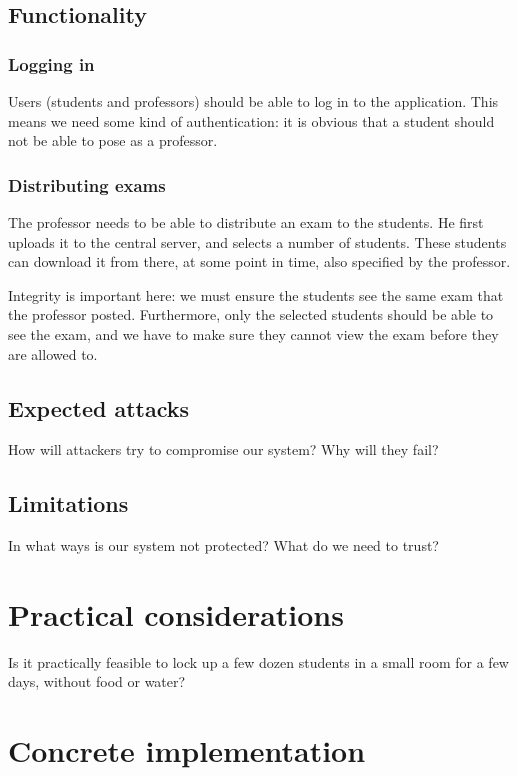 \documentclass{article}
\begin{document}
\subsection{Functionality}

\subsubsection{Logging in}

Users (students and professors) should be able to log in to the application.
This means we need some kind of authentication: it is obvious that a student
should not be able to pose as a professor.

\subsubsection{Distributing exams}

The professor needs to be able to distribute an exam to the students. He first
uploads it to the central server, and selects a number of students. These
students can download it from there, at some point in time, also specified by
the professor.

Integrity is important here: we must ensure the students see the same exam that
the professor posted. Furthermore, only the selected students should be able to
see the exam, and we have to make sure they cannot view the exam before they are
allowed to.

\subsection{Expected attacks}

How will attackers try to compromise our system? Why will they fail?

\subsection{Limitations}

In what ways is our system not protected? What do we need to trust?

\section{Practical considerations}

Is it practically feasible to lock up a few dozen students in a small room for a
few days, without food or water?

\section{Concrete implementation}
\end{document}
